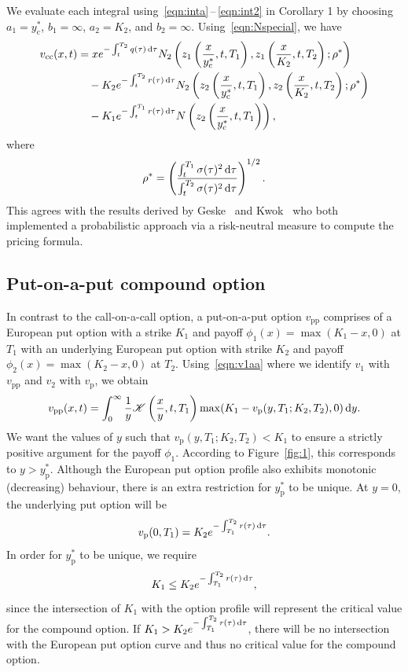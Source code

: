 We evaluate each integral using~\eqref{eqn:inta}\,--\,\eqref{eqn:int2} in Corollary 1 by choosing $a_1 = y_\mathrm{c}^*$, $b_1 = \infty$, $a_2 = K_2$, and $b_2 = \infty$. Using~\eqref{eqn:Nspecial}, we have
	\begin{equation}
		\label{eqn:vcc}
		\begin{split}
		v_\text{cc}(x,t) &=  xe^{-\int_t^{T_2} q(\tau) \, \mathrm d\tau}N_2\left( z_1\left( \frac{x}{y_\mathrm{c}^*}, t, T_1 \right), z_1\left( \frac{x}{K_2}, t, T_2 \right); \rho^* \right)  \\
		&\quad - K_2e^{-\int_t^{T_2} r(\tau) \, \mathrm d\tau} N_2\left( z_2\left( \frac{x}{y_\mathrm{c}^*}, t, T_1 \right), z_2\left( \frac{x}{K_2}, t, T_2 \right); \rho^* \right) \\
		&\quad - K_1e^{-\int_t^{T_1} r(\tau) \,\mathrm d\tau}N\left( z_2\left( \frac{x}{y_\mathrm{c}^*}, t, T_1 \right) \right),
		\end{split}
	\end{equation}
where
	\begin{equation}
		\label{eqn:rho2}
		\rho^* = \left(\frac{\int_t^{T_1} \sigma(\tau)^2 \, \mathrm d\tau}{\int_t^{T_2} \sigma(\tau)^2 \, \mathrm d\tau}\right)^{1/2}.
	\end{equation}
This agrees with the results derived by Geske~\cite{Geske1979} and Kwok~\cite{Kwok2008} who both implemented a probabilistic approach via a risk-neutral measure to compute the pricing formula.

\subsection{Put-on-a-put compound option}
In contrast to the call-on-a-call option, a put-on-a-put option $v_\mathrm{pp}$ comprises of a European put option with a strike $K_1$ and payoff $\phi_1(x) = \max(K_1-x,0)$ at $T_1$ with an underlying European put option with strike $K_2$ and payoff $\phi_2(x) = \max(K_2-x,0)$ at $T_2$. Using~\eqref{eqn:v1aa} where we identify $v_1$ with $v_\mathrm{pp}$ and $v_2$ with $v_\mathrm{p}$, we obtain
	$$
		v_\mathrm{pp}(x,t) = \int_0^\infty \frac{1}{y}\mathscr K\left( \frac{x}{y}, t, T_1 \right)\max(K_1 - v_\mathrm{p}(y,T_1;K_2,T_2), 0) \, \mathrm d y.
	$$
We want the values of $y$ such that $v_\mathrm{p}(y,T_1;K_2,T_2) < K_1$ to ensure a strictly positive argument for the payoff $\phi_1$. According to Figure~\ref{fig:1}, this corresponds to $y > y_\mathrm{p}^*$. Although the European put option profile also exhibits monotonic (decreasing) behaviour, there is an extra restriction for $y_\mathrm{p}^*$ to be unique. At $y=0$, the underlying put option will be
	$$
		v_\text{p}(0,T_1) = K_2e^{-\int_{T_1}^{T_2} r(\tau) \, \mathrm d\tau}.
	$$
	In order for $y_\text{p}^*$ to be unique, we require
	\begin{equation}
		\label{eqn:pprestriction}
		K_1 \leq K_2e^{-\int_{T_1}^{T_2} r(\tau) \, \mathrm d\tau},
	\end{equation}
	since the intersection of $K_1$ with the option profile will represent the critical value for the compound option. If $K_1 > K_2e^{-\int_{T_1}^{T_2} r(\tau) \, \mathrm d\tau}$, there will be no intersection with the European put option curve and thus no critical value for the compound option.

